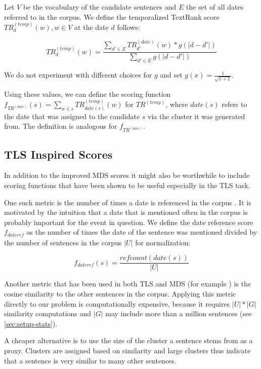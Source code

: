 \documentclass[a4paper,BCOR=10mm]{report}
\numberwithin{lemma}{chapter}
\numberwithin{definition}{chapter}
\begin{document}
Let $V$ be the vocabulary of the candidate sentences and $E$ the set of all dates referred to in the corpus. We define the temporalized TextRank score $TR^{(temp)}_d(w), w \in V$ at the date $d$ follows:

\begin{equation}
    TR^{(temp)}_d(w) = \frac{\sum_{d' \in E} TR^{(date)}_{d'}(w) * g(|d - d'|)}{\sum_{d' \in E} g(|d - d'|)}
\end{equation}

We do not experiment with different choices for $g$ and set $g(x) = \frac{1}{\sqrt{x + 1}}$.

Using these values, we can define the scoring function $f_{TR^{(date)}}(s) = \sum_{w \in s} TR^{(temp)}_{\mathit{date}(s)}(w)$ for $TR^{(temp)}$, where $\mathit{date}(s)$ refers to the date that was assigned to the candidate $s$ via the cluster it was generated from.
The definition is analogous for $f_{TR^{(date)}}$.

\subsection{TLS Inspired Scores} \label{sec:tls-scores}

In addition to the improved MDS scores it might also be worthwhile to include scoring functions that have been shown to be useful especially in the TLS task.

One such metric is the number of times a date is referenced in the corpus \citep{markert, datesel-graph}. It is motivated by the intuition that a date that is mentioned often in the corpus is probably important for the event in question. We define the date reference score $f_{\mathit{dateref}}$ as the number of times the date of the sentence was mentioned divided by the number of sentences in the corpus $|U|$ for normalization:

\begin{equation}
f_{\mathit{dateref}}(s) = \frac{\mathit{refcount}(\mathit{date}(s))}{|U|}
\end{equation}

Another metric that has been used in both TLS \citep{chieu} and MDS (for example \citet{lexrank}) is the cosine similarity to the other sentences in the corpus.
Applying this metric directly to our problem is computationally expensive, because it requires $|U| * |G|$ similarity computations and $|G|$ may include more than a million sentences (see \ref{sec:setup-stats}).

A cheaper alternative is to use the size of the cluster a sentence stems from as a proxy. Clusters are assigned based on similarity and large clusters thus indicate that a sentence is very similar to many other sentences.
\end{document}
